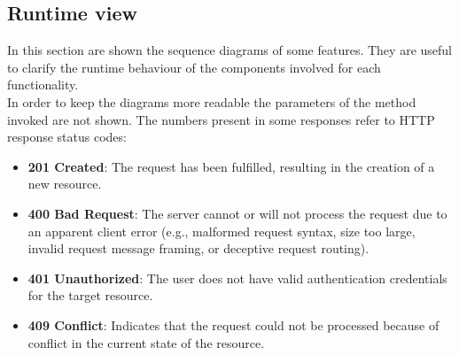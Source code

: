 \documentclass{article}
\begin{document}
\subsection{Runtime view}
\label{sec:Runtime}
 In this section are shown the sequence diagrams of some features. They are useful to clarify the runtime behaviour of the components involved for each functionality.\\
 In order to keep the diagrams more readable the parameters of the method invoked are not shown.
The numbers present in some responses refer to HTTP response status codes:
\begin{itemize}
	\item \textbf{201 Created}: The request has been fulfilled, resulting in the creation of a new resource.
	\item \textbf{400 Bad Request}: The server cannot or will not process the request due to an apparent client error (e.g., malformed request syntax, size too large, invalid request message framing, or deceptive request routing).
	\item \textbf{401 Unauthorized}: The user does not have valid authentication credentials for the target resource.
	\item \textbf{409 Conflict}: Indicates that the request could not be processed because of conflict in the current state of the resource. 
\end{itemize}


\newpage
\end{document}
